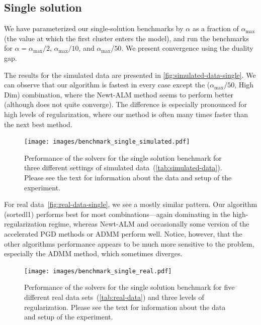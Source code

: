 \documentclass[article]{jss}
\begin{document}
\subsection{Single solution}\label{sec:single-solution-benchmark}

We have parameterized our single-solution benchmarks by \(\alpha\) as a
fraction of \(\alpha_\text{max}\) (the value at which the first cluster enters
the model), and run the benchmarks for \(\alpha = \alpha_\text{max}/2\),
\(\alpha_\text{max}/10\), and \(\alpha_\text{max}/50\). We present convergence using
the duality gap.

The results for the simulated data are presented in \autoref{fig:simulated-data-single}.
We can observe that our algorithm is fastest in every case except
the (\(\alpha_\text{max}/50\), High Dim) combination, where the Newt-ALM
method seems to perform better (although does not quite converge). The difference
is especially pronounced for high levels of regularization, where our method is
often many times faster than the next best method.

\begin{figure}[tp]
  \centering
  \texttt{[image: images/benchmark\_single\_simulated.pdf]}
  \caption{%
    Performance of the solvers for the single solution benchmark for three different settings
    of simulated data~(\autoref{tab:simulated-data}).
    Please see the text for information about the data and setup of the experiment.
  }
  \label{fig:simulated-data-single}
\end{figure}

For real data~\autoref{fig:real-data-single}, we see a mostly similar pattern.
Our algorithm (sortedl1) performs best for most combinations---again dominating
in the high-regularization regime, whereas Newt-ALM and occasionally some version of
the accelerated PGD methods or ADMM perform well. Notice, however, that the other algorithms
performance appears to be much more sensitive to the problem, especially the
ADMM method, which sometimes diverges.

\begin{figure}[tp]
  \centering
  \texttt{[image: images/benchmark\_single\_real.pdf]}
  \caption{%
    Performance of the solvers for the single solution benchmark for five
    different real data sets~(\autoref{tab:real-data}) and three levels of
    regularization. Please see the text for information about the data and
    setup of the experiment.
  }
  \label{fig:real-data-single}
\end{figure}
\end{document}
